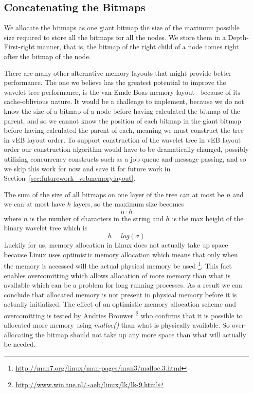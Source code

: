 \subsection{Concatenating the Bitmaps}
We allocate the bitmaps as one giant bitmap the size of the maximum possible size required to store all the bitmaps for all the nodes.
We store them in a Depth-First-right manner, that is, the bitmap of the right child of a node comes right after the bitmap of the node.

There are many other alternative memory layouts that might provide better performance.
The one we believe has the greatest potential to improve the wavelet tree performance, is the van Emde Boas memory layout~\citep[Abstract]{Brodal02cacheoblivious} because of its cache-oblivious nature.
It would be a challenge to implement, because we do not know the size of a bitmap of a node before having calculated the bitmap of the parent, and so we cannot know the position of each bitmap in the giant bitmap before having calculated the parent of each, meaning we must construct the tree in vEB layout order.
To support construction of the wavelet tree in vEB layout order our construction algorithm would have to be dramatically changed, possibly utilizing concurrency constructs such as a job queue and message passing, and so we skip this work for now and save it for future work in Section~\ref{sec:futurework_vebmemorylayout}.

The sum of the size of all bitmaps on one layer of the tree can at most be $n$ and we can at most have $h$ layers, so the maximum size becomes
\[n \cdot h\]
where $n$ is the number of characters in the string and $h$ is the max height of the binary wavelet tree which is
\[ h = log(\sigma) \]
Luckily for us, memory allocation in Linux does not actually take up space because Linux uses optimistic memory allocation which means that only when the memory is accessed will the actual physical memory be used \footnote{\url{http://man7.org/linux/man-pages/man3/malloc.3.html}}.
This fact enables overcomitting which allows allocation of more memory than what is available which can be a problem for long running processes.
As a result we can conclude that allocated memory is not present in physical memory before it is actually initialized.
The effect of an optimistic memory allocation scheme and overcomitting is tested by Andries Brouwer \footnote{\url{http://www.win.tue.nl/~aeb/linux/lk/lk-9.html}} who confirms that it is possible to allocated more memory using \textit{malloc()} than what is physically available.
So over-allocating the bitmap should not take up any more space than what will actually be needed.

